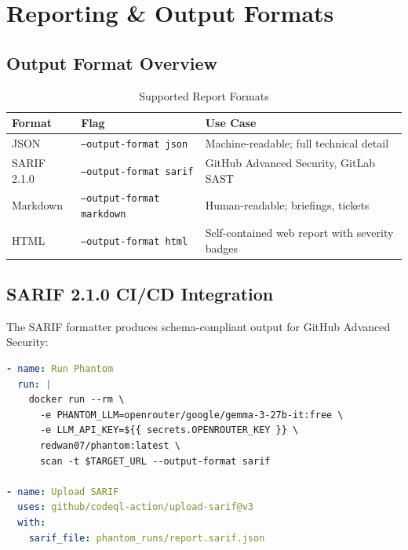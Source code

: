 \documentclass[12pt,a4paper]{article}
\begin{document}
\section{Reporting \& Output Formats}

\subsection{Output Format Overview}

\begin{table}[H]
\centering
\caption{Supported Report Formats}
\begin{tabular}{llp{7cm}}
\toprule
\textbf{Format} & \textbf{Flag} & \textbf{Use Case} \\
\midrule
JSON & \texttt{--output-format json} & Machine-readable; full technical detail \\
SARIF 2.1.0 & \texttt{--output-format sarif} & GitHub Advanced Security, GitLab SAST \\
Markdown & \texttt{--output-format markdown} & Human-readable; briefings, tickets \\
HTML & \texttt{--output-format html} & Self-contained web report with severity badges \\
\bottomrule
\end{tabular}
\end{table}

\subsection{SARIF 2.1.0 CI/CD Integration}

The SARIF formatter produces schema-compliant output for GitHub Advanced Security:

\begin{lstlisting}[language=yaml, caption={GitHub Actions integration}]
- name: Run Phantom
  run: |
    docker run --rm \
      -e PHANTOM_LLM=openrouter/google/gemma-3-27b-it:free \
      -e LLM_API_KEY=${{ secrets.OPENROUTER_KEY }} \
      redwan07/phantom:latest \
      scan -t $TARGET_URL --output-format sarif

- name: Upload SARIF
  uses: github/codeql-action/upload-sarif@v3
  with:
    sarif_file: phantom_runs/report.sarif.json
\end{lstlisting}



\end{document}
